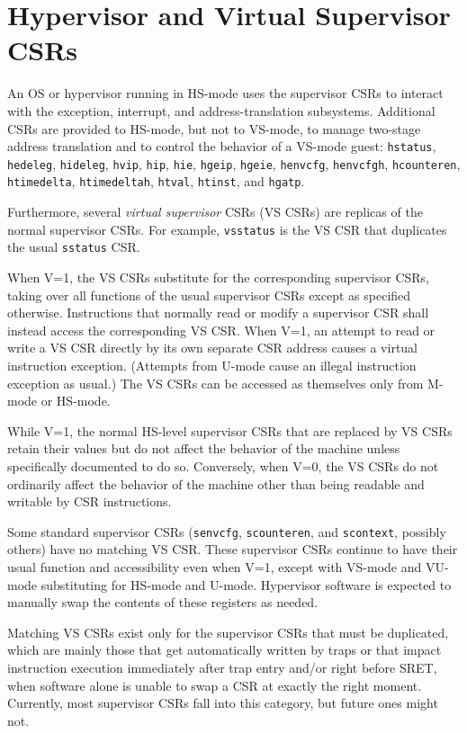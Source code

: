 \section{Hypervisor and Virtual Supervisor CSRs}

An OS or hypervisor running in HS-mode uses the supervisor CSRs to interact with the exception,
interrupt, and address-translation subsystems.
Additional CSRs are provided to HS-mode, but not to VS-mode, to manage
two-stage address translation and to control the behavior of a VS-mode guest:
{\tt hstatus}, {\tt hedeleg}, {\tt hideleg}, {\tt hvip}, {\tt hip}, {\tt hie},
{\tt hgeip}, {\tt hgeie}, {\tt henvcfg}, {\tt henvcfgh},
{\tt hcounteren}, {\tt htimedelta}, {\tt htimedeltah}, {\tt htval},
{\tt htinst}, and {\tt hgatp}.

Furthermore, several {\em virtual supervisor} CSRs (VS CSRs) are replicas
of the normal supervisor CSRs.
For example, {\tt vsstatus} is the VS CSR that duplicates the usual
{\tt sstatus} CSR.

When V=1, the VS CSRs substitute for the corresponding supervisor CSRs,
taking over all functions of the usual supervisor CSRs except as specified
otherwise.
Instructions that normally read or modify a supervisor CSR shall instead
access the corresponding VS CSR.
When V=1, an attempt to read or write a VS CSR directly by its own
separate CSR address causes a virtual instruction exception.
(Attempts from U-mode cause an illegal instruction exception as usual.)
The VS CSRs can be accessed as themselves only from M-mode or HS-mode.

While V=1, the normal HS-level supervisor CSRs that are replaced by
VS CSRs retain their values but do
not affect the behavior of the machine unless specifically documented to
do so.
Conversely, when V=0, the VS CSRs do not ordinarily affect the behavior of
the machine other than being readable and writable by CSR instructions.

Some standard supervisor CSRs ({\tt senvcfg},
{\tt scounteren}, and {\tt scontext},
possibly others) have no matching VS CSR.
These supervisor CSRs continue to have their usual function and
accessibility even when V=1, except with VS-mode and VU-mode substituting for
HS-mode and U-mode.
Hypervisor software is expected to manually swap the contents of these
registers as needed.

\begin{commentary}
Matching VS CSRs exist only for the supervisor CSRs that must be
duplicated, which are mainly those that get automatically written by
traps or that impact instruction execution immediately after trap entry
and/or right before SRET, when software alone is unable to swap a CSR at
exactly the right moment.
Currently, most supervisor CSRs fall into this category, but future ones
might not.
\end{commentary}

